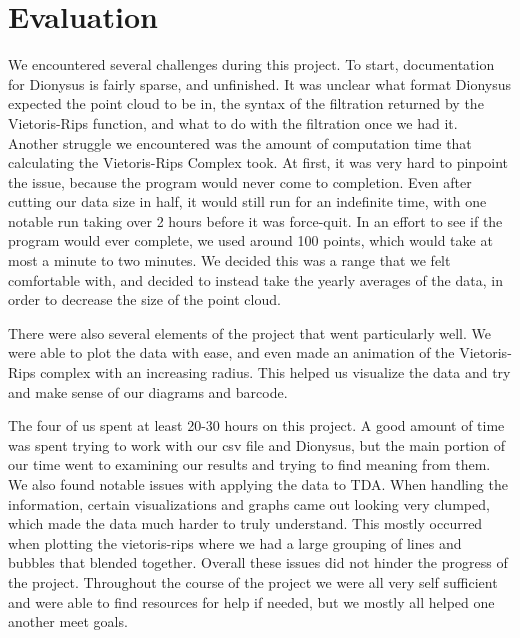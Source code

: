 \documentclass[12pt]{report}
\begin{document}
\section*{Evaluation}
We encountered several challenges during this project. To start, documentation for Dionysus is fairly sparse, and unfinished. It was unclear what format Dionysus expected the point cloud to be in, the syntax of the filtration returned by the Vietoris-Rips function, and what to do with the filtration once we had it. Another struggle we encountered was the amount of computation time that calculating the Vietoris-Rips Complex took. At first, it was very hard to pinpoint the issue, because the program would never come to completion. Even after cutting our data size in half, it would still run for an indefinite time, with one notable run taking over 2 hours before it was force-quit. In an effort to see if the program would ever complete, we used around 100 points, which would take at most a minute to two minutes. We decided this was a range that we felt comfortable with, and decided to instead take the yearly averages of the data, in order to decrease the size of the point cloud.\par 
There were also several elements of the project that went particularly well. We were able to plot the data with ease, and even made an animation of the Vietoris-Rips complex with an increasing radius. This helped us visualize the data and try and make sense of our diagrams and barcode. \par
The four of us spent at least 20-30 hours on this project. A good amount of time was spent trying to work with our csv file and Dionysus, but the main portion of our time went to examining our results and trying to find meaning from them. We also found notable issues with applying the data to TDA. When handling the information, certain visualizations and graphs came out looking very clumped, which made the data much harder to truly understand. This mostly occurred when plotting the vietoris-rips where we had a large grouping of lines and bubbles that blended together. Overall these issues did not hinder the progress of the project. Throughout the course of the project we were all very self sufficient and were able to find resources for help if needed, but we mostly all helped one another meet goals.

\clearpage
\end{document}
